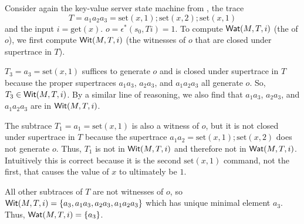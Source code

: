\begin{example}
  \newcommand{\Mget}{\text{get}}
  \newcommand{\Mset}{\text{set}}
  Consider again the key-value server state machine from
  , the trace
  \[
    T = a_1 a_2 a_3 = \Mset(x, 1); \Mset(x, 2); \Mset(x, 1)
  \]
  and the input $i = \Mget(x)$. $o = \epsilon^*(s_0, Ti) = 1$. To compute
  $\textsf{Wat}(M, T, i)$ (the \watprovenance{} of $o$), we first compute $\textsf{Wit}(M, T,
  i)$ (the witnesses of $o$ that are closed under supertrace in $T$).


  $T_3 = a_3 = \Mset(x, 1)$ suffices to generate $o$ and is closed under
  supertrace in $T$ because the proper supertraces $a_1a_3$, $a_2a_3$, and
  $a_1a_2a_3$ all generate $o$.  So, $T_3 \in \textsf{Wit}(M, T, i)$. By a similar line
  of reasoning, we also find that $a_1a_3$, $a_2a_3$, and $a_1a_2a_3$ are in
  $\textsf{Wit}(M, T, i)$.

  The subtrace $T_1 = a_1 = \Mset(x, 1)$ is also a witness of $o$, but it is
  not closed under supertrace in $T$ because the supertrace $a_1a_2 = \Mset(x,
  1); \Mset(x, 2)$ does not generate $o$. Thus, $T_1$ is not in $\textsf{Wit}(M, T, i)$
  and therefore not in $\textsf{Wat}(M, T, i)$.  Intuitively this is correct because it
  is the second $\Mset(x, 1)$ command, not the first, that causes the value of
  $x$ to ultimately be $1$.

  All other subtraces of $T$ are not witnesses of $o$, so $\textsf{Wit}(M, T, i) =
  \{a_3, a_1a_3, a_2a_3, a_1a_2a_3\}$ which has unique minimal element $a_3$.
  Thus, $\textsf{Wat}(M, T, i) = \{a_3\}$.
\end{example}

